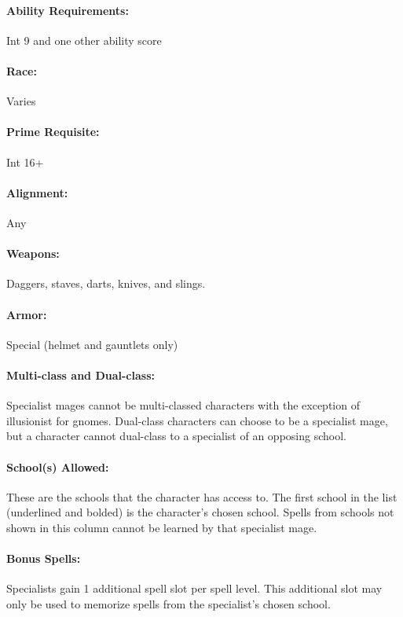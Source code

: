 \begin{multicols}{2}
\paragraph{Ability Requirements:} Int 9 and one other ability score

\paragraph{Race:} Varies

\paragraph{Prime Requisite:} Int 16+

\paragraph{Alignment:} Any

\paragraph{Weapons:} Daggers, staves, darts, knives, and slings.

\paragraph{Armor:} Special (helmet and gauntlets only)

\paragraph{Multi-class and Dual-class:} Specialist mages cannot be multi-classed characters with the exception of illusionist for gnomes.  Dual-class characters can choose to be a specialist mage, but a character cannot dual-class to a specialist of an opposing school.

\paragraph{School(s) Allowed:} These are the schools that the character has access to.  The first school in the list (underlined and bolded) is the character's chosen school.  Spells from schools not shown in this column cannot be learned by that specialist mage.

\paragraph{Bonus Spells:} Specialists gain 1 additional spell slot per spell level.  This additional slot may only be used to memorize spells from the specialist's chosen school.


\end{multicols}
